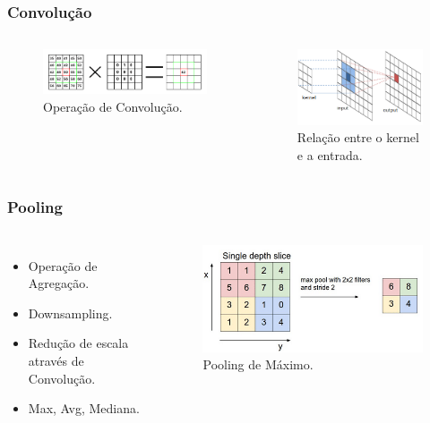 \documentclass{beamer}
\begin{document}
\begin{frame}
\frametitle{Convolução}
    \begin{columns}[c]
        \begin{figure}
        \includegraphics[width=0.9\linewidth]{images/convolution-calculate}
        \caption{Operação de Convolução.}
        \end{figure}
        \begin{figure}
        \includegraphics[width=0.9\linewidth]{images/diagram-conv}
        \caption{Relação entre o kernel e a entrada.}
        \end{figure}
    \end{columns}
\end{frame}

\begin{frame}
\frametitle{Pooling}
\begin{columns}[c]
\begin{itemize}
\item Operação de Agregação.
\item Downsampling.
\item Redução de escala através de Convolução.
\item Max, Avg, Mediana.
\end{itemize}
\begin{figure}
\includegraphics[width=0.8\linewidth]{images/pooling}
\caption{Pooling de Máximo.}
\end{figure}
\end{columns}
\end{frame}
\end{document}
